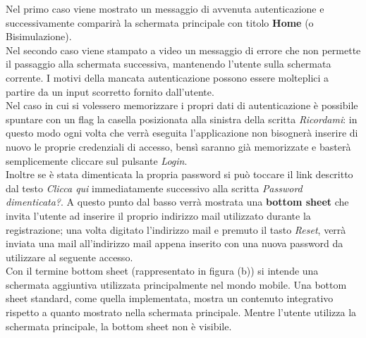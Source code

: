 \documentclass[a4paper,11pt,twoside,openright]{report}
\begin{document}
Nel primo caso viene mostrato un messaggio di avvenuta autenticazione e successivamente comparirà la schermata principale con titolo \textbf{Home} (o Bisimulazione).\\
Nel secondo caso viene stampato a video un messaggio di errore che non permette il passaggio alla schermata successiva, mantenendo l'utente sulla schermata
corrente. I motivi della mancata autenticazione possono essere molteplici a partire da un input scorretto fornito dall'utente.\\
Nel caso in cui si volessero memorizzare i propri dati di autenticazione è possibile spuntare con un flag la casella posizionata alla sinistra della scritta \textit{Ricordami}: in
questo modo ogni volta che verrà eseguita l'applicazione non bisognerà inserire di nuovo le proprie credenziali di accesso, bensì saranno già memorizzate e basterà
semplicemente cliccare sul pulsante \textit{Login}.\\
Inoltre se è stata dimenticata la propria password si può toccare il link descritto dal testo \textit{Clicca qui} immediatamente successivo alla scritta \textit{Password dimenticata?}.
A questo punto dal basso verrà mostrata una \textbf{bottom sheet} che invita l'utente ad inserire il proprio indirizzo mail utilizzato durante la registrazione; una volta digitato
 l'indirizzo mail e premuto il tasto \textit{Reset}, verrà inviata una mail all'indirizzo mail appena inserito con una nuova password da utilizzare al seguente accesso.\\
Con il termine bottom sheet \cite{11} (rappresentato in figura (b)) si intende una schermata aggiuntiva utilizzata principalmente nel mondo mobile. Una bottom sheet standard, come quella implementata, mostra un contenuto integrativo rispetto a quanto mostrato nella schermata principale. Mentre l'utente utilizza la schermata principale, la bottom sheet non è visibile.
\end{document}
